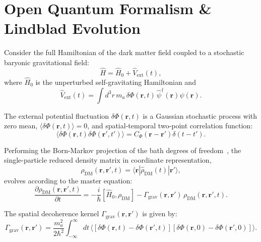 \documentclass[aps,prd,twocolumn,superscriptaddress,nofootinbib,floatfix,longbibliography]{revtex4-2}
\begin{document}
\section{Open Quantum Formalism \& Lindblad Evolution}
\label{sec:master}

Consider the full Hamiltonian of the dark matter field coupled to a stochastic baryonic gravitational field:
\begin{equation}
\hat{H} = \hat{H}_0 + \hat{V}_{\text{ext}}(t),
\end{equation}
where $\hat{H}_0$ is the unperturbed self-gravitating Hamiltonian and
\begin{equation}
\hat{V}_{\text{ext}}(t) = \int d^3r \, m_a \, \delta\Phi(\mathbf{r}, t) \, \hat{\psi}^\dagger(\mathbf{r}) \hat{\psi}(\mathbf{r}).
\end{equation}

The external potential fluctuation $\delta\Phi(\mathbf{r}, t)$ is a Gaussian stochastic process with zero mean, $\langle \delta\Phi(\mathbf{r}, t) \rangle = 0$, and spatial-temporal two-point correlation function:
\begin{equation}
\langle \delta\Phi(\mathbf{r}, t) \delta\Phi(\mathbf{r}', t') \rangle = C_\Phi(\mathbf{r} - \mathbf{r}') \delta(t - t').
\end{equation}

Performing the Born-Markov projection of the bath degrees of freedom~\cite{Lindblad1976,Zurek2003}, the single-particle reduced density matrix in coordinate representation,
\begin{equation}
\rho_{\text{DM}}(\mathbf{r}, \mathbf{r}', t) = \langle \mathbf{r} | \hat{\rho}_{\text{DM}}(t) | \mathbf{r}' \rangle,
\end{equation}
evolves according to the master equation:
\begin{equation}
\frac{\partial \rho_{\text{DM}}(\mathbf{r}, \mathbf{r}', t)}{\partial t} = -\frac{i}{\hbar} [\hat{H}_0, \rho_{\text{DM}}] - \Gamma_{\text{grav}}(\mathbf{r}, \mathbf{r}') \, \rho_{\text{DM}}(\mathbf{r}, \mathbf{r}', t).
\label{eq:master}
\end{equation}

The spatial decoherence kernel $\Gamma_{\text{grav}}(\mathbf{r}, \mathbf{r}')$ is given by:
\begin{equation}
\Gamma_{\text{grav}}(\mathbf{r}, \mathbf{r}') = \frac{m_a^2}{2\hbar^2} \int_{-\infty}^\infty dt \, \langle [\delta\Phi(\mathbf{r}, t) - \delta\Phi(\mathbf{r}', t)] [\delta\Phi(\mathbf{r}, 0) - \delta\Phi(\mathbf{r}', 0)] \rangle.
\end{equation}
\end{document}
